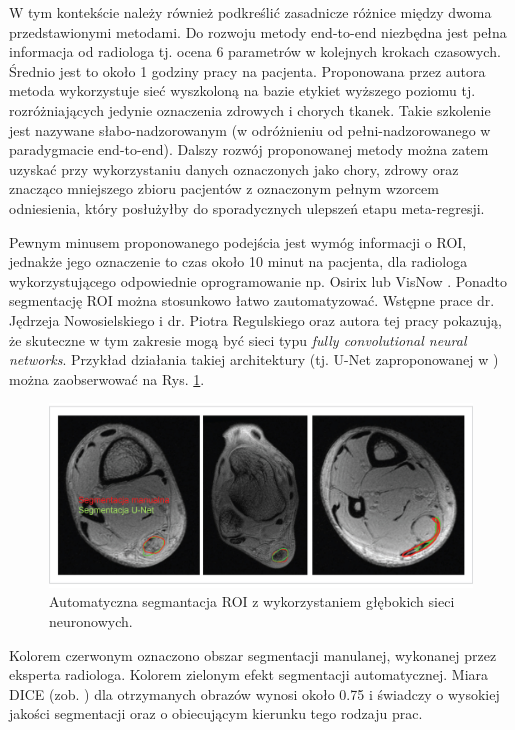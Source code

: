 W tym kontekście należy również podkreślić zasadnicze różnice między dwoma przedstawionymi metodami. Do rozwoju metody end-to-end niezbędna jest pełna informacja od radiologa tj. ocena 6 parametrów w kolejnych krokach czasowych. Średnio jest to około 1 godziny pracy na pacjenta. Proponowana przez autora metoda wykorzystuje sieć wyszkoloną na bazie etykiet wyższego poziomu tj. rozróżniających jedynie oznaczenia zdrowych i chorych tkanek. Takie szkolenie jest nazywane słabo-nadzorowanym (w odróżnieniu od pełni-nadzorowanego w paradygmacie end-to-end). Dalszy rozwój proponowanej metody można zatem uzyskać przy wykorzystaniu danych oznaczonych jako chory, zdrowy oraz znacząco mniejszego zbioru pacjentów z oznaczonym pełnym wzorcem odniesienia, który posłużyłby do sporadycznych ulepszeń etapu meta-regresji. 

Pewnym minusem proponowanego podejścia jest wymóg informacji o ROI, jednakże jego oznaczenie to czas około 10 minut na pacjenta, dla radiologa wykorzystującego odpowiednie oprogramowanie np. Osirix \cite{Rosset2004} lub VisNow \cite{Nowinski_Borucki_2014}. Ponadto segmentację ROI można stosunkowo łatwo zautomatyzować. Wstępne prace dr. Jędrzeja Nowosielskiego i dr. Piotra Regulskiego oraz autora tej pracy pokazują, że skuteczne w tym zakresie mogą być sieci typu \textit{fully convolutional neural networks}. Przykład działania takiej architektury (tj. U-Net zaproponowanej w \cite{Ronneberger2015}) można zaobserwować na Rys. \ref{fig:segmentacja}. 

\begin{figure}[h]
	\centering
	\includegraphics[width=1\textwidth]{figures/Segmentacja.jpg}
	\caption{Automatyczna segmantacja ROI z wykorzystaniem głębokich sieci neuronowych.}\label{fig:segmentacja}
\end{figure}
Kolorem czerwonym oznaczono obszar segmentacji manulanej, wykonanej przez eksperta radiologa. Kolorem zielonym efekt segmentacji automatycznej. Miara DICE (zob. \cite{Zou2004}) dla otrzymanych obrazów wynosi około 0.75 i świadczy o wysokiej jakości segmentacji oraz o obiecującym kierunku tego rodzaju prac.

